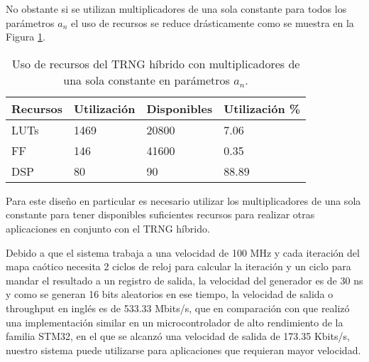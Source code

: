        No obstante si se utilizan multiplicadores de una sola constante para todos los parámetros $a_{n}$ el uso de recursos se reduce drásticamente como se muestra en la Figura \ref{tab:recursos_op}.

        \begin{table}[htbp]
            \centering
            \caption{Uso de recursos del TRNG híbrido con multiplicadores de una sola constante en parámetros $a_{n}$.}
            \begin{tabular}{|l|l|l|l|}
                \hline
                \rowcolor{lightgray} Recursos  & Utilización & Disponibles & Utilización \% \\
                \hline
                LUTs      & 1469  & 20800    & 7.06  \\
                \hline
                FF     & 146  & 41600   & 0.35  \\
                \hline
                DSP       & 80  & 90   & 88.89  \\
                \hline
            \end{tabular}
            \label{tab:recursos_op}
        \end{table}

        Para este diseño en particular es necesario utilizar los multiplicadores de una sola constante para tener disponibles suficientes recursos para realizar otras aplicaciones en conjunto con el TRNG híbrido.

        Debido a que el sistema trabaja a una velocidad de 100 MHz y cada iteración del mapa caótico necesita 2 ciclos de reloj para calcular la iteración y un ciclo para mandar el resultado a un registro de salida, la velocidad del generador es de 30 ns y como se generan 16 bits aleatorios en ese tiempo, la velocidad de salida o throughput en inglés es de 533.33 Mbits/s, que en comparación con \cite{Fraga2021} que realizó una implementación similar en un microcontrolador de alto rendimiento de la familia STM32, en el que se alcanzó una velocidad de salida de 173.35 Kbits/s, nuestro sistema puede utilizarse para aplicaciones que requieran mayor velocidad.


